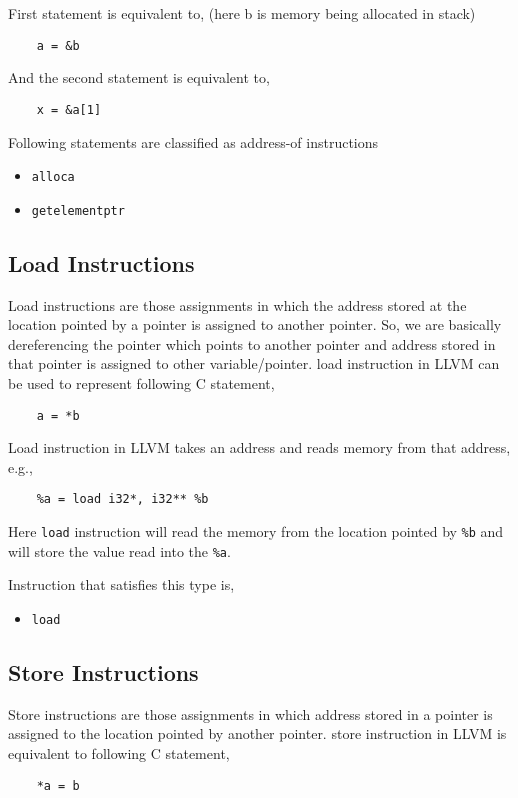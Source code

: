 \documentclass[a4paper,12pt]{report}
\begin{document}
\noindent
First statement is equivalent to, (here b is memory being allocated in stack)

\begin{lstlisting}
    a = &b
\end{lstlisting}

\noindent
And the second statement is equivalent to,
\begin{lstlisting}
    x = &a[1]
\end{lstlisting}

\noindent
Following statements are classified as address-of instructions
\begin{itemize}
    \item \texttt{alloca}
    \item \texttt{getelementptr}
\end{itemize}

\subsection{Load Instructions}
Load instructions are those assignments in which the address stored at the 
location pointed by a pointer is assigned to another pointer. So, we are 
basically dereferencing the pointer which points to another pointer and address 
stored in that pointer is assigned to other variable/pointer.
load instruction in LLVM can be used to represent following C statement,
\begin{lstlisting}
    a = *b
\end{lstlisting}

\noindent
Load instruction in LLVM takes an address and reads memory from that address,
e.g.,

\begin{verbatim}
    %a = load i32*, i32** %b
\end{verbatim}

\noindent
Here \texttt{load} instruction will read the memory from the location pointed 
by \texttt{\%b} and will store the value read into the \texttt{\%a}.

\noindent
Instruction that satisfies this type is,
\begin{itemize}
 \item \texttt{load}
\end{itemize}


\subsection{Store Instructions}
Store instructions are those assignments in which address stored in a pointer 
is assigned to the location pointed by another pointer.
store instruction in LLVM is equivalent to following C statement,
\begin{lstlisting}
    *a = b
\end{lstlisting}
\end{document}
